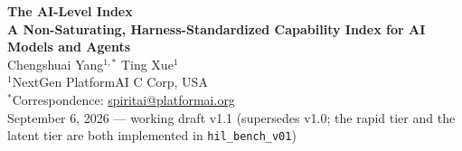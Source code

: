 
\begin{center}
{\LARGE\bfseries The AI-Level Index}\\[6pt]
{\large\bfseries A Non-Saturating, Harness-Standardized Capability Index for AI Models and Agents}\\[14pt]
{\large Chengshuai Yang$^{1,*}$ \quad Ting Xue$^{1}$}\\[5pt]
{\normalsize $^{1}$NextGen PlatformAI C Corp, USA}\\[4pt]
{\normalsize $^{*}$Correspondence: \href{mailto:spiritai@platformai.org}{spiritai@platformai.org}}\\[10pt]
{\small September 6, 2026 --- working draft v1.1 (supersedes v1.0; the rapid tier and the latent tier are both implemented in \texttt{hil\_bench\_v01})}
\end{center}

